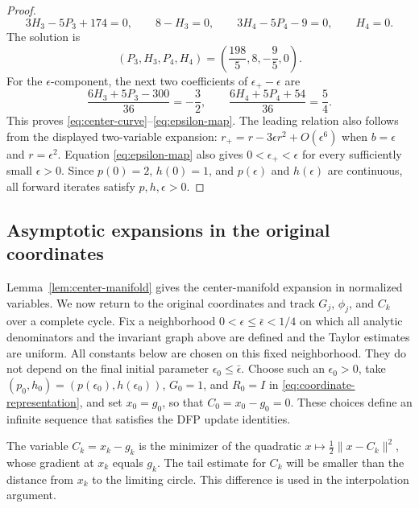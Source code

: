 \documentclass[11pt]{article}
\begin{document}
\begin{proof}
\begin{equation}
3H_3-5P_3+174=0,\qquad 8-H_3=0,\qquad
3H_4-5P_4-9=0,\qquad H_4=0.
\end{equation}
The solution is
\[
(P_3,H_3,P_4,H_4)=\left(\frac{198}{5},8,-\frac95,0\right).
\]
For the $\epsilon$-component, the next two coefficients of
$\epsilon_+-\epsilon$ are
\[
\frac{6H_3+5P_3-300}{36}=-\frac32,
\qquad
\frac{6H_4+5P_4+54}{36}=\frac54.
\]
This proves \eqref{eq:center-curve}--\eqref{eq:epsilon-map}.  The leading
relation also follows from the displayed two-variable expansion:
$r_+=r-3\epsilon r^2+O(\epsilon^6)$ when
$b=\epsilon$ and $r=\epsilon^2$.
Equation \eqref{eq:epsilon-map} also gives
$0<\epsilon_+<\epsilon$ for every sufficiently small $\epsilon>0$.
Since $p(0)=2$, $h(0)=1$, and $p(\epsilon)$ and $h(\epsilon)$ are continuous,
all forward iterates satisfy $p,h,\epsilon>0$.
\end{proof}

\subsection{Asymptotic expansions in the original coordinates}

Lemma~\ref{lem:center-manifold} gives the center-manifold expansion in
normalized variables.  We now return to the original coordinates and track
$G_j$, $\phi_j$, and $C_k$ over a complete cycle.  Fix a neighborhood
$0<\epsilon\le\bar\epsilon<1/4$ on which all analytic denominators and the
invariant graph above are defined and the Taylor estimates are uniform.  All
constants below are chosen on this fixed neighborhood.  They do not depend on
the final initial parameter
$\epsilon_0\le\bar\epsilon$.  Choose such an $\epsilon_0>0$, take
$(p_0,h_0)=(p(\epsilon_0),h(\epsilon_0))$, $G_0=1$, and $R_0=I$ in
\eqref{eq:coordinate-representation}, and set $x_0=g_0$, so that
$C_0=x_0-g_0=0$.
These choices define an infinite sequence that satisfies the DFP update
identities.

The variable $C_k=x_k-g_k$ is the minimizer of the quadratic
$x\mapsto\frac12\|x-C_k\|^2$, whose gradient at $x_k$ equals $g_k$.
The tail estimate for $C_k$ will be smaller than the distance from $x_k$ to the
limiting circle.  This difference is used in the interpolation argument.
\end{document}
